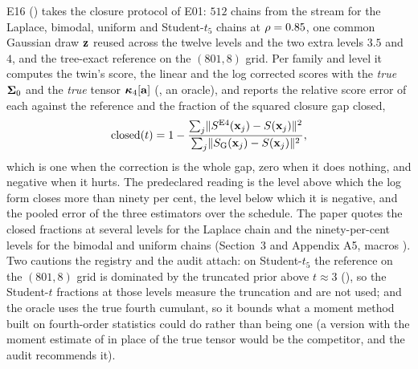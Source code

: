 E16 () takes the closure protocol of E01:
$512$ chains from the stream  for the Laplace,
bimodal, uniform and Student-$t_5$ chains at $\rho=0.85$, one common Gaussian draw
$\mathbf{z}$ reused across the twelve levels and the two extra levels $3.5$ and $4$, and the
tree-exact reference on the $(801,8)$ grid. Per family and level it computes the twin's
score, the linear and the log corrected scores with the \emph{true} $\mathbf{\Sigma}_0$ and the
\emph{true} tensor $\bm{\kappa}_4[\mathbf{a}]$ (, an oracle), and reports
the relative score error of each against the reference and the fraction of the squared
closure gap closed,
\begin{equation}
  \text{closed}(t)=1-\frac{\sum_j\lVert S^{\mathrm{E4}}(\mathbf{x}_j)-S(\mathbf{x}_j)\rVert^2}{\sum_j\lVert S_{\mathrm{G}}(\mathbf{x}_j)-S(\mathbf{x}_j)\rVert^2},
\end{equation}
which is one when the correction is the whole gap, zero when it does nothing, and
negative when it hurts. The predeclared reading is the level above which the log form
closes more than ninety per cent, the level below which it is negative, and the pooled
error of the three estimators over the schedule. The paper quotes the closed fractions at
several levels for the Laplace chain and the ninety-per-cent levels for the bimodal and
uniform chains (Section~3 and Appendix A5, macros ). Two cautions
the registry and the audit attach: on Student-$t_5$ the reference on the $(801,8)$ grid
is dominated by the truncated prior above $t\approx3$ (), so the
Student-$t$ fractions at those levels measure the truncation and are not used; and the
oracle uses the true fourth cumulant, so it bounds what a moment method built on
fourth-order statistics could do rather than being one (a version with the moment
estimate of  in place of the true tensor would be the
competitor, and the audit recommends it).



